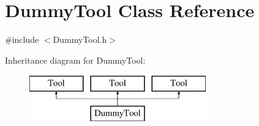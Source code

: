 \hypertarget{classDummyTool}{\section{Dummy\-Tool Class Reference}
\label{classDummyTool}
}


{\ttfamily \#include $<$Dummy\-Tool.\-h$>$}

Inheritance diagram for Dummy\-Tool\-:\begin{figure}[H]
\begin{center}
\leavevmode
\includegraphics[height=2.000000cm]{classDummyTool}
\end{center}
\end{figure}
